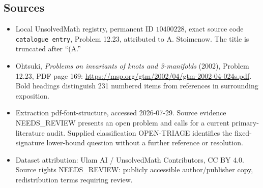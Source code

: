\documentclass[11pt]{article}
\begin{document}
\subsection{Sources}
\begin{itemize}
\item Local UnsolvedMath registry, permanent ID \(10400228\), exact source code \texttt{catalogue entry}, Problem 12.23, attributed to A. Stoimenow. The title is truncated after ``(A.''
\item Ohtsuki, \emph{Problems on invariants of knots and 3-manifolds} (2002), Problem 12.23, PDF page 169: \url{https://msp.org/gtm/2002/04/gtm-2002-04-024s.pdf}. Bold headings distinguish 231 numbered items from references in surrounding exposition.
\item Extraction pdf-font-structure, accessed 2026-07-29. Source evidence NEEDS\_REVIEW presents an open problem and calls for a current primary-literature audit. Supplied classification OPEN-TRIAGE identifies the fixed-signature lower-bound question without a further reference or resolution.
\item Dataset attribution: Ulam AI / UnsolvedMath Contributors, CC BY 4.0. Source rights NEEDS\_REVIEW: publicly accessible author/publisher copy, redistribution terms requiring review.
\end{itemize}
\end{document}
